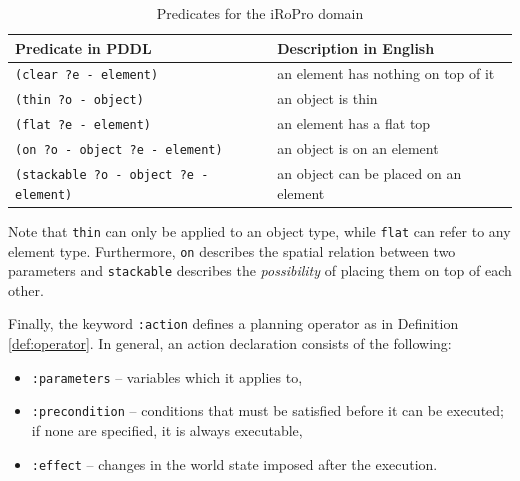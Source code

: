 \begin{table}[h]
\begin{center}
	\label{tab:predicates}
	\caption{Predicates for the {iRoPro} domain}
\begin{tabular}{l|l}
Predicate in PDDL & Description in English\\ \hline
\texttt{(clear ?e - element)} & an element has nothing on top of it \\
\texttt{(thin ?o - object)} & an object is thin\\
\texttt{(flat ?e - element)} & an element has a flat top \\
\texttt{(on ?o - object ?e - element)} & an object is on an element\\
\texttt{(stackable ?o - object ?e - element)} & an object can be placed on an element\\
\end{tabular}
\end{center}
\end{table}%

Note that \texttt{thin} can only be applied to an object type, while \texttt{flat} can refer to any element type.
Furthermore, \texttt{on} describes the spatial relation between two parameters and \texttt{stackable} describes the \textit{possibility} of placing them on top of each other.

Finally, the keyword \texttt{:action} defines a planning operator as in Definition \ref{def:operator}.
In general, an action declaration consists of the following:
\begin{itemize}
	\item \texttt{:parameters} -- variables which it applies to,
	\item \texttt{:precondition} -- conditions that must be satisfied before it can be executed; if none are specified, it is always executable,
	\item \texttt{:effect} -- changes in the world state imposed after the execution.
\end{itemize}

